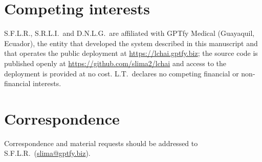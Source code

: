 \section*{Competing interests}
S.F.L.R., S.R.L.I.\ and D.N.L.G.\ are affiliated with GPTfy Medical
(Guayaquil, Ecuador), the entity that developed the \lchai{} system
described in this manuscript and that operates the public deployment at
\url{https://lchai.gptfy.biz}; the source code is published openly at
\url{https://github.com/slima2/lchai} and access to the deployment is
provided at no cost.
L.T.\ declares no competing financial or non-financial interests.

\section*{Correspondence}
Correspondence and material requests should be addressed to
S.F.L.R.\ (\href{mailto:slima@gptfy.biz}{slima@gptfy.biz}).
